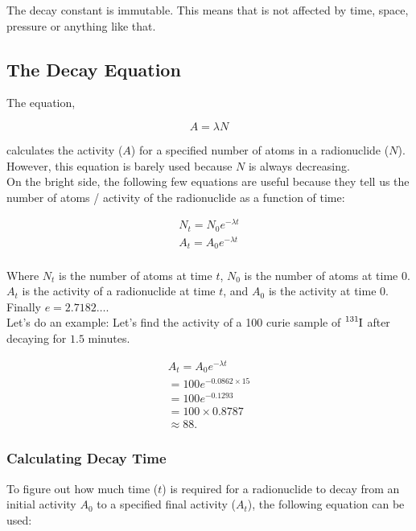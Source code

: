 \documentclass{article}
\begin{document}
\begin{multicols*}{2}
    The decay constant is immutable. This means that is not affected by time,
    space, pressure or anything like that.
    
    \subsection{The Decay Equation}
    The equation,

    \[
      A = \lambda{N}
    \]

    calculates the activity ($A$) for a specified number of atoms in a
    radionuclide ($N$). However, this equation is barely used because
    $N$ is always decreasing.\\
    
    On the bright side, the following few equations are useful because
    they tell us the number of atoms / activity of the radionuclide as
    a function of time:

    \begin{equation*}
      \begin{split}
        N_t = N_{0}e^{-\lambda{t}} \\
        A_t = A_{0}e^{-\lambda{t}} \\
      \end{split}
    \end{equation*}

    Where $N_t$ is the number of atoms at time $t$, $N_0$ is the number
    of atoms at time $0$. $A_t$ is the activity of a radionuclide at time $t$,
    and $A_0$ is the activity at time $0$. Finally $e = 2.7182\ldots$.\\

    Let's do an example: Let's find the activity of a 100 curie sample of
    $\ce{^{131}I}$ after decaying for $1.5$ minutes.

    \begin{equation*}
      \begin{split}
        A_t = A_{0}e^{-\lambda{t}} \\
        = 100e^{-0.0862 \times 15} \\
        = 100e^{-0.1293} \\
        = 100 \times 0.8787 \\
        \approx 88.
      \end{split}
    \end{equation*}

    \subsubsection{Calculating Decay Time}
    To figure out how much time ($t$) is required for a radionuclide to decay
    from an initial activity $A_0$ to a specified final activity ($A_t$), the
    following equation can be used:


\end{multicols*}
\end{document}
